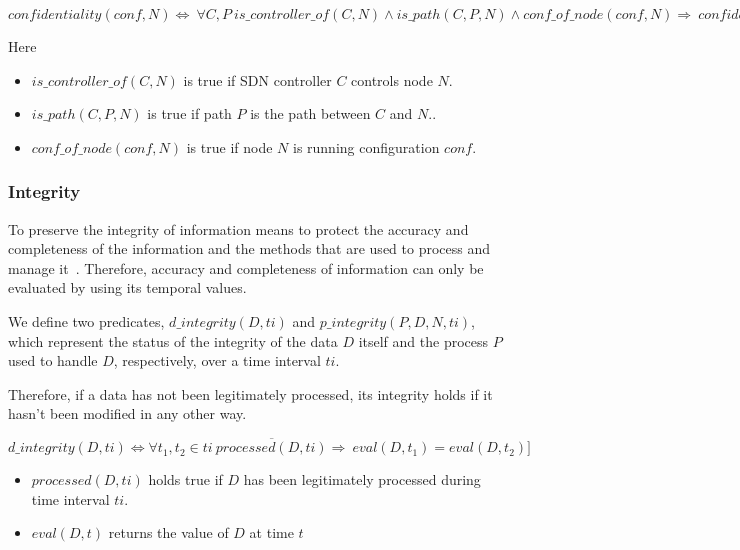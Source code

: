 \begin{myformula}
$confidentiality(conf,N) \Leftrightarrow~\forall C,P 
~is\_controller\_of(C,N) \wedge is\_path(C,P,N) \wedge  conf\_of\_node(conf,N) \Rightarrow
~confidentiality(C) \wedge confidentiality(P) \wedge  confidentiality(N)
$
\end{myformula}


Here \begin{itemize}
\item $is\_controller\_of(C,N)$ is true if SDN controller $C$ controls node $N$.  
\item $is\_path(C,P,N)$ is true if path $P$ is the path between $C$ and $N$..
\item $conf\_of\_node(conf, N)$ is true if node $N$ is running configuration $conf$.
\end{itemize}

\subsubsection{Integrity}
\label{sec:prop-int}
 To preserve the integrity of information means to protect the accuracy and completeness of the information and the methods that are used to process and manage it~\cite{ISO/IEC270012013}.
Therefore, accuracy and completeness of information can only be evaluated by using its temporal values.

We define two predicates, $d\_integrity(D,ti)$ and $p\_integrity(P,D,N,ti)$, which represent the status of the integrity of the data $D$ itself and the process $P$ used to handle $D$, respectively, over a time interval $ti$. 

Therefore, if a data has not been legitimately processed, its integrity holds if it hasn't been modified in any other way.
\begin{myformula}
$d\_integrity(D,ti) \Leftrightarrow \forall t_1,t_2\in ti ~ \overline{processed(D, ti)} \Rightarrow 
~eval(D,t_1)=eval(D,t_2)]$ 
\end{myformula}

\begin{itemize}
\item $processed(D, ti)$ holds true if $D$ has been legitimately processed during time interval $ti$.
\item $eval(D,t)$ returns the value of $D$ at time $t$

\end{itemize}

